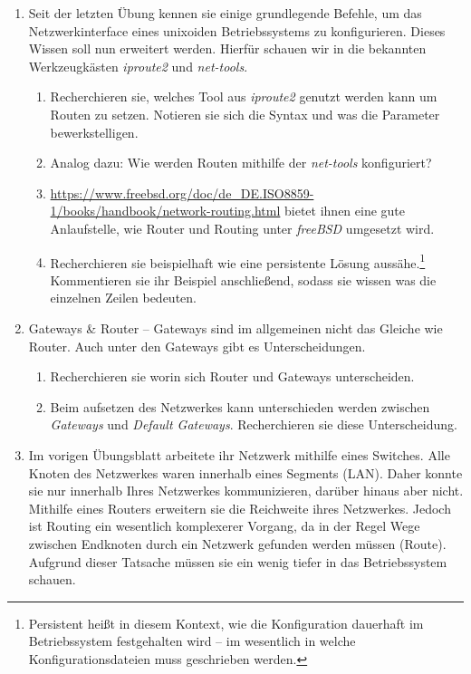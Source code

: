\documentclass[paper=a4,fontsize=11pt]{scrartcl}%
\numberwithin{equation}{section}
\begin{document}
\begin{enumerate}
	\item Seit der letzten Übung kennen sie einige grundlegende Befehle, um das Netzwerkinterface eines unixoiden Betriebssystems zu konfigurieren. Dieses Wissen soll nun erweitert werden. Hierfür schauen wir in die bekannten Werkzeugkästen \emph{iproute2} und \emph{net-tools}.
	\begin{enumerate}
	\item Recherchieren sie, welches Tool aus \emph{iproute2} genutzt werden kann um Routen zu setzen. Notieren sie sich die Syntax und was die Parameter bewerkstelligen.
	\item Analog dazu: Wie werden Routen mithilfe der \emph{net-tools} konfiguriert?
	\item \url{https://www.freebsd.org/doc/de_DE.ISO8859-1/books/handbook/network-routing.html} bietet ihnen eine gute Anlaufstelle, wie Router und Routing unter \emph{freeBSD} umgesetzt wird.
	\item Recherchieren sie beispielhaft wie eine persistente Lösung aussähe.\footnote{Persistent heißt in diesem Kontext, wie die Konfiguration dauerhaft im Betriebssystem festgehalten wird -- im wesentlich in welche Konfigurationsdateien muss geschrieben werden.}\\
	Kommentieren sie ihr Beispiel anschließend, sodass sie wissen was die einzelnen Zeilen bedeuten.
	\end{enumerate}
	\item Gateways \& Router -- Gateways sind im allgemeinen nicht das Gleiche wie Router. Auch unter den Gateways gibt es Unterscheidungen.
	\begin{enumerate}
	\item Recherchieren sie worin sich Router und Gateways unterscheiden.
	\item Beim aufsetzen des Netzwerkes kann unterschieden werden zwischen \emph{Gateways} und \emph{Default Gateways}. Recherchieren sie diese Unterscheidung.
	\end{enumerate}
	\item Im vorigen Übungsblatt arbeitete ihr Netzwerk mithilfe eines Switches. Alle Knoten des Netzwerkes waren innerhalb eines Segments (LAN). Daher konnte sie nur innerhalb Ihres Netzwerkes kommunizieren, darüber hinaus aber nicht. Mithilfe eines Routers erweitern sie die Reichweite ihres Netzwerkes. Jedoch ist Routing ein wesentlich komplexerer Vorgang, da in der Regel Wege zwischen Endknoten durch ein Netzwerk gefunden werden müssen (Route). Aufgrund dieser Tatsache müssen sie ein wenig tiefer in das Betriebssystem schauen.

\end{enumerate}
\end{document}
